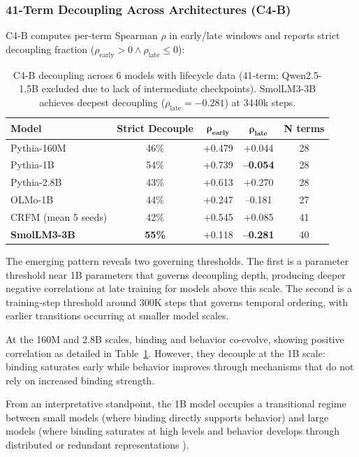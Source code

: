 \documentclass[10pt]{article} %
\begin{document}
\subsubsection{41-Term Decoupling Across Architectures (C4-B)}

C4-B computes per-term Spearman $\rho$ in early/late windows and reports strict decoupling fraction ($\rho_\text{early}>0 \land \rho_\text{late}\leq 0$):

\begin{table}[H]
\centering
\small
\begin{tabular}{|l|c|c|c|c|}
\hline
\textbf{Model} & \textbf{Strict Decouple} & $\mathbf{\rho_\text{early}}$ & $\mathbf{\rho_\text{late}}$ & \textbf{N terms} \\
\hline
Pythia-160M & 46\% & +0.479 & +0.044 & 28 \\
Pythia-1B & 54\% & +0.739 & \textbf{--0.054} & 28 \\
Pythia-2.8B & 43\% & +0.613 & +0.270 & 28 \\
OLMo-1B & 44\% & +0.247 & --0.181 & 27 \\
CRFM (mean 5 seeds) & 42\% & +0.545 & +0.085 & 41 \\
\textbf{SmolLM3-3B} & \textbf{55\%} & +0.118 & \textbf{--0.281} & 40 \\
\hline
\end{tabular}
\caption{C4-B decoupling across 6 models with lifecycle data (41-term; Qwen2.5-1.5B excluded due to lack of intermediate checkpoints). SmolLM3-3B achieves deepest decoupling ($\rho_\text{late}=-0.281$) at 3440k steps.}
\label{tab:c4b_decoupling}
\end{table}

The emerging pattern reveals two governing thresholds. The first is a parameter threshold near 1B parameters that governs decoupling depth, producing deeper negative correlations at late training for models above this scale. The second is a training-step threshold around 300K steps that governs temporal ordering, with earlier transitions occurring at smaller model scales.

At the 160M and 2.8B scales, binding and behavior co-evolve, showing positive correlation as detailed in Table~\ref{tab:c4b_decoupling}.
However, they decouple at the 1B scale: binding saturates early while behavior improves through mechanisms that do not rely on increased binding strength.

From an interpretative standpoint, the 1B model occupies a transitional regime \citep{kaplan2020scaling} between small models (where binding directly supports behavior) and large models (where binding saturates at high levels and behavior develops through distributed or redundant representations \citep{hinton1986distributed}).
\end{document}
